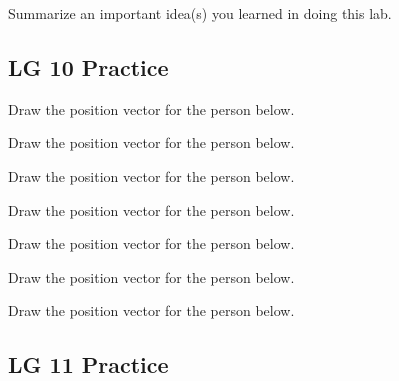 \documentclass[]{exam}
\begin{document}
\begin{questions}
\begin{parts}
\ifprintanswers 
\else \fillwithlines{14mm}
\fi
\end{parts}

\question
Summarize an important idea(s) you learned in doing this lab.

\ifprintanswers 
\else \fillwithlines{14mm}
\fi

\clearpage



\end{questions}

\clearpage


\subsection*{LG 10 Practice}

\begin{questions}

\question 
Draw the position vector for the person below.


\question 
Draw the position vector for the person below.


\question 
Draw the position vector for the person below.


\question 
Draw the position vector for the person below.


\question 
Draw the position vector for the person below.


\question 
Draw the position vector for the person below.


\question 
Draw the position vector for the person below.


\end{questions}

\clearpage

\subsection*{LG 11 Practice}
\end{document}
